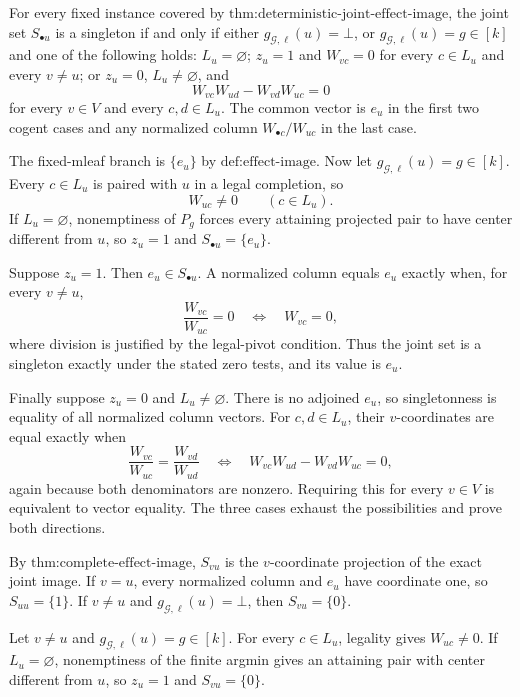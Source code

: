 For every fixed instance covered by \(\text{thm:deterministic-joint-effect-image}\), the joint set \(S_{\bullet u}\) is a singleton if and only if either \(g_{\mathcal G,\ell}(u)=\bot\), or \(g_{\mathcal G,\ell}(u)=g\in[k]\) and one of the following holds: \(L_u=\varnothing\); \(z_u=1\) and \(W_{vc}=0\) for every \(c\in L_u\) and every \(v\ne u\); or \(z_u=0\), \(L_u\ne\varnothing\), and
\[
W_{vc}W_{ud}-W_{vd}W_{uc}=0
\]
for every \(v\in V\) and every \(c,d\in L_u\).  The common vector is \(e_u\) in the first two cogent cases and any normalized column \(W_{\bullet c}/W_{uc}\) in the last case.

The fixed-mleaf branch is \(\{e_u\}\) by \(\text{def:effect-image}\).  Now let \(g_{\mathcal G,\ell}(u)=g\in[k]\).  Every \(c\in L_u\) is paired with \(u\) in a legal completion, so
\[
W_{uc}\ne0\qquad(c\in L_u).
\]
If \(L_u=\varnothing\), nonemptiness of \(P_g\) forces every attaining projected pair to have center different from \(u\), so \(z_u=1\) and \(S_{\bullet u}=\{e_u\}\).

Suppose \(z_u=1\).  Then \(e_u\in S_{\bullet u}\).  A normalized column equals \(e_u\) exactly when, for every \(v\ne u\),
\[
\frac{W_{vc}}{W_{uc}}=0
\quad\Longleftrightarrow\quad
W_{vc}=0,
\]
where division is justified by the legal-pivot condition.  Thus the joint set is a singleton exactly under the stated zero tests, and its value is \(e_u\).

Finally suppose \(z_u=0\) and \(L_u\ne\varnothing\).  There is no adjoined \(e_u\), so singletonness is equality of all normalized column vectors.  For \(c,d\in L_u\), their \(v\)-coordinates are equal exactly when
\[
\frac{W_{vc}}{W_{uc}}=\frac{W_{vd}}{W_{ud}}
\quad\Longleftrightarrow\quad
W_{vc}W_{ud}-W_{vd}W_{uc}=0,
\]
again because both denominators are nonzero.  Requiring this for every \(v\in V\) is equivalent to vector equality.  The three cases exhaust the possibilities and prove both directions.

By \(\text{thm:complete-effect-image}\), \(S_{vu}\) is the \(v\)-coordinate projection of the exact joint image.  If \(v=u\), every normalized column and \(e_u\) have coordinate one, so \(S_{uu}=\{1\}\).  If \(v\ne u\) and \(g_{\mathcal G,\ell}(u)=\bot\), then \(S_{vu}=\{0\}\).

Let \(v\ne u\) and \(g_{\mathcal G,\ell}(u)=g\in[k]\).  For every \(c\in L_u\), legality gives \(W_{uc}\ne0\).  If \(L_u=\varnothing\), nonemptiness of the finite argmin gives an attaining pair with center different from \(u\), so \(z_u=1\) and \(S_{vu}=\{0\}\).

